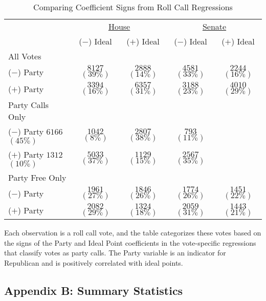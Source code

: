 \documentclass[12pt]{article}
\begin{document}
\begin{table}[!htbp]
\centering
\begin{threeparttable}
\singlespacing
\caption{Comparing Coefficient Signs from Roll Call Regressions}
\label{tab-sorting}
\begin{tabular}{l cc|cc}
\hline
&\multicolumn{2}{c}{\underline{House}}&\multicolumn{2}{c}{\underline{Senate}}\\
& ($-$) Ideal & ($+$) Ideal & ($-$) Ideal & ($+$) Ideal \\
\hline
All Votes \\
\hline
($-$) Party & $8127$ $(39\%)$& $2888$ $(14\%)$& $4581$ $(33\%)$& $2244$ $(16\%)$\\
($+$) Party & $3394$ $(16\%)$& $6357$ $(31\%)$& $3188$ $(23\%)$& $4010$ $(29\%)$\\
\hline
Party Calls Only\\
\hline
($-$) Party $6166$ $(45\%)$& $1042$ $( 8\%)$& $2807$ $(38\%)$& $793$ $(11\%)$\\
($+$) Party $1312$ $(10\%)$& $5033$ $(37\%)$& $1129$ $(15\%)$& $2567$ $(35\%)$\\
\hline
Party Free Only\\
\hline
($-$) Party & $1961$ $(27\%)$& $1846$ $(26\%)$& $1774$ $(26\%)$& $1451$ $(22\%)$\\
($+$) Party & $2082$ $(29\%)$& $1324$ $(18\%)$& $2059$ $(31\%)$& $1443$ $(21\%)$\\
\hline
\end{tabular}
\begin{tablenotes}
   \item
   Each observation is a roll call vote, and the table categorizes these votes based on the signs of the Party and Ideal Point coefficients
   in the vote-specific regressions that classify votes as party calls.
   The Party variable is an indicator for Republican and is positively correlated with ideal points.
 \end{tablenotes}
\end{threeparttable}
\end{table}

\clearpage


\subsection*{Appendix B: Summary Statistics}
%
\end{document}
